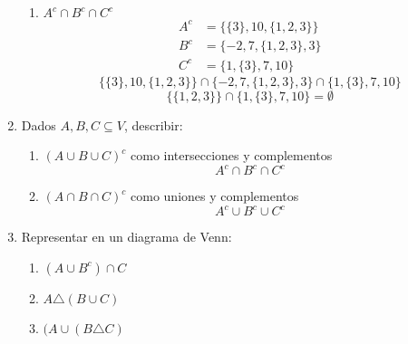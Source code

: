 \documentclass[../practica.root.tex]{subfiles}
\begin{document}
\begin{enumerate}
\begin{enumerate}
              \item $A^c \cap B^c \cap C^c$
                    \begin{align*}
                        A^c & = \{\{3\}, 10, \{1, 2, 3\}\} \\
                        B^c & = \{-2, 7, \{1, 2, 3\}, 3\}  \\
                        C^c & = \{1, \{3\}, 7, 10\}
                    \end{align*}
                    \[ \{\{3\}, 10, \{1, 2, 3\}\} \cap \{-2, 7, \{1, 2, 3\}, 3\} \cap \{1, \{3\}, 7, 10\} \]
                    \[ \{ \{1, 2, 3\} \} \cap \{1, \{3\}, 7, 10\} = \boxed{\emptyset} \]
          \end{enumerate}

    \item Dados $A, B, C \subseteq V$, describir:
          \begin{enumerate}
              \item $(A \cup B \cup C)^c$ como intersecciones y complementos
                    \[ \boxed{A^c \cap B^c \cap C^c} \]
              \item $(A \cap B \cap C)^c$ como uniones y complementos
                    \[ \boxed{A^c \cup B^c \cup C^c} \]
          \end{enumerate}

    \item Representar en un diagrama de Venn: \\
          \begin{enumerate}
              \item $(A \cup B^c) \cap C$
              \item $A \triangle (B \cup C)$
              \item $(A \cup (B \triangle C)$
          \end{enumerate}
          \begin{figure}[h]
              \centering
\end{figure}
\end{enumerate}
\end{document}
